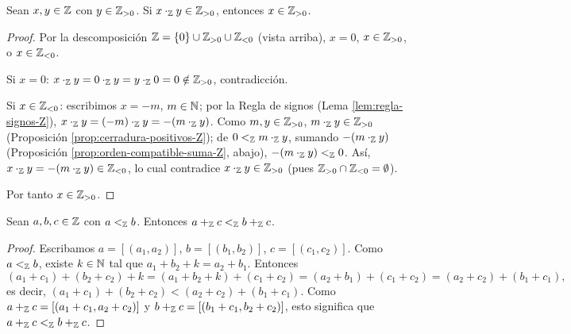 \documentclass[12pt,a4paper]{book}
\begin{document}
    \begin{lema}
        \label{lem:signo-factor-Z}
        Sean $x,y\in\mathbb{Z}$ con $y\in\mathbb{Z}_{>0}$. Si $x\cdot_{\mathbb{Z}}y\in\mathbb{Z}_{>0}$, entonces $x\in\mathbb{Z}_{>0}$.
    \end{lema}
    \begin{proof}
        Por la descomposición $\mathbb{Z}=\{0\}\cup\mathbb{Z}_{>0}\cup\mathbb{Z}_{<0}$ (vista arriba), $x=0$, $x\in\mathbb{Z}_{>0}$, o $x\in\mathbb{Z}_{<0}$.

        Si $x=0$: $x\cdot_{\mathbb{Z}}y=0\cdot_{\mathbb{Z}}y=y\cdot_{\mathbb{Z}}0=0\notin\mathbb{Z}_{>0}$, contradicción.

        Si $x\in\mathbb{Z}_{<0}$: escribimos $x=-m$, $m\in\mathbb{N}$; por la Regla de signos (Lema \ref{lem:regla-signos-Z}), $x\cdot_{\mathbb{Z}}y=(-m)\cdot_{\mathbb{Z}}y=-(m\cdot_{\mathbb{Z}}y)$. Como $m,y\in\mathbb{Z}_{>0}$, $m\cdot_{\mathbb{Z}}y\in\mathbb{Z}_{>0}$ (Proposición \ref{prop:cerradura-positivos-Z}); de $0<_{\mathbb{Z}}m\cdot_{\mathbb{Z}}y$, sumando $-(m\cdot_{\mathbb{Z}}y)$ (Proposición \ref{prop:orden-compatible-suma-Z}, abajo), $-(m\cdot_{\mathbb{Z}}y)<_{\mathbb{Z}}0$. Así, $x\cdot_{\mathbb{Z}}y=-(m\cdot_{\mathbb{Z}}y)\in\mathbb{Z}_{<0}$, lo cual contradice $x\cdot_{\mathbb{Z}}y\in\mathbb{Z}_{>0}$ (pues $\mathbb{Z}_{>0}\cap\mathbb{Z}_{<0}=\emptyset$).

        Por tanto $x\in\mathbb{Z}_{>0}$.
    \end{proof}

    \begin{proposicion}
        \label{prop:orden-compatible-suma-Z}
        Sean $a,b,c\in\mathbb{Z}$ con $a<_{\mathbb{Z}}b$. Entonces $a+_{\mathbb{Z}}c<_{\mathbb{Z}}b+_{\mathbb{Z}}c$.
    \end{proposicion}
    \begin{proof}
        Escribamos $a=[(a_{1},a_{2})]$, $b=[(b_{1},b_{2})]$, $c=[(c_{1},c_{2})]$. Como $a<_{\mathbb{Z}}b$, existe $k\in\mathbb{N}$ tal que $a_{1}+b_{2}+k=a_{2}+b_{1}$. Entonces
        \begin{equation*}
            (a_{1}+c_{1})+(b_{2}+c_{2})+k = (a_{1}+b_{2}+k)+(c_{1}+c_{2}) = (a_{2}+b_{1})+(c_{1}+c_{2}) = (a_{2}+c_{2})+(b_{1}+c_{1}),
        \end{equation*}
        es decir, $(a_{1}+c_{1})+(b_{2}+c_{2})<(a_{2}+c_{2})+(b_{1}+c_{1})$. Como $a+_{\mathbb{Z}}c=[(a_{1}+c_{1},a_{2}+c_{2})]$ y $b+_{\mathbb{Z}}c=[(b_{1}+c_{1},b_{2}+c_{2})]$, esto significa que $a+_{\mathbb{Z}}c<_{\mathbb{Z}}b+_{\mathbb{Z}}c$.
    \end{proof}
\end{document}

